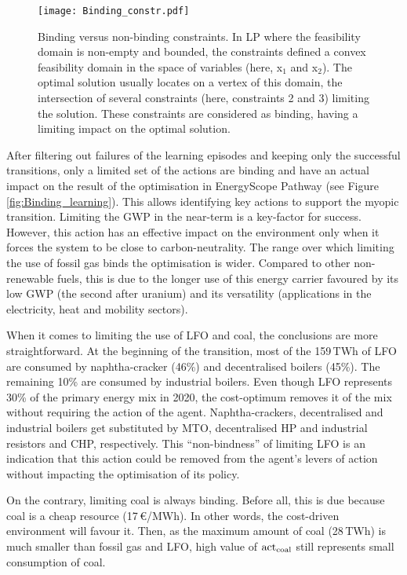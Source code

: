 \begin{figure}[!htbp]
\centering
\texttt{[image: Binding\_constr.pdf]}
\caption{Binding versus non-binding constraints. In \gls{LP} where the feasibility domain is non-empty and bounded, the constraints defined a convex feasibility domain in the space of variables (here, x$_1$ and x$_2$). The optimal solution usually locates on a vertex of this domain, \ie the intersection of several constraints (here, constraints 2 and 3) limiting the solution. These constraints are considered as binding, \ie having a limiting impact on the optimal solution.}
\label{fig:Binding_constr}
\end{figure} 

After filtering out failures of the learning episodes and keeping only the successful transitions, only a limited set of the actions are binding and have an actual impact on the result of the optimisation in EnergyScope Pathway (see Figure \ref{fig:Binding_learning}). This allows identifying key actions to support the myopic transition. Limiting the \gls{GWP} in the near-term is a key-factor for success. However, this action has an effective impact on the environment only when it forces the system to be close to carbon-neutrality. The range over which limiting the use of fossil gas binds the optimisation is wider. Compared to other non-renewable fuels, this is due to the longer use of this energy carrier favoured by its low \gls{GWP} (the second after uranium) and its versatility (applications in the electricity, heat and mobility sectors).

When it comes to limiting the use of \gls{LFO} and coal, the conclusions are more straightforward. At the beginning of the transition, most of the 159\,TWh of \gls{LFO} are consumed by naphtha-cracker (46\%) and decentralised boilers (45\%). The remaining 10\% are consumed by industrial boilers. Even though \gls{LFO} represents  30\% of the primary energy mix in 2020, the cost-optimum removes it of the mix without requiring the action of the agent. Naphtha-crackers, decentralised and industrial boilers get substituted by \gls{MTO}, decentralised \gls{HP} and industrial resistors and \gls{CHP}, respectively.  This ``non-bindness'' of limiting \gls{LFO} is an indication that this action could be removed from the agent's levers of action without impacting the optimisation of its policy.

On the contrary, limiting coal is always binding. Before all, this is due because coal is a cheap resource (17\,€/MWh). In other words, the cost-driven environment will favour it. Then, as the maximum amount of coal (28\,TWh) is much smaller than fossil gas and \gls{LFO}, high value of $\mathrm{act}\textsubscript{coal}$ still represents small consumption of coal.


